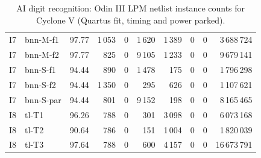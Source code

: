 \begin{table}[t]
\begin{tabular}{llrrrrrrrr}
\midrule
I7 & bnn-M-f1 & 97.77 & 1\,053 & 0 & 1\,620 & 1\,389 & 0 & 0 & 3\,688\,724 \\
I7 & bnn-M-f2 & 97.77 & 825 & 0 & 9\,105 & 1\,233 & 0 & 0 & 9\,679\,141 \\
I7 & bnn-S-f1 & 94.44 & 890 & 0 & 1\,478 & 175 & 0 & 0 & 1\,796\,298 \\
I7 & bnn-S-f2 & 94.44 & 1\,350 & 0 & 295 & 626 & 0 & 0 & 1\,107\,621 \\
I7 & bnn-S-par & 94.44 & 801 & 0 & 9\,152 & 198 & 0 & 0 & 8\,165\,465 \\
\midrule
I8 & tl-T1 & 96.26 & 788 & 0 & 301 & 3\,098 & 0 & 0 & 6\,073\,168 \\
I8 & tl-T2 & 90.64 & 786 & 0 & 151 & 1\,004 & 0 & 0 & 1\,820\,039 \\
I8 & tl-T3 & 97.64 & 788 & 0 & 600 & 4\,157 & 0 & 0 & 16\,673\,791 \\
\bottomrule
\end{tabular}
\caption{AI digit recognition: Odin III LPM netlist instance counts for Cyclone V (Quartus fit, timing and power parked).}
\label{tab:aidigit-lpm}
\end{table}


